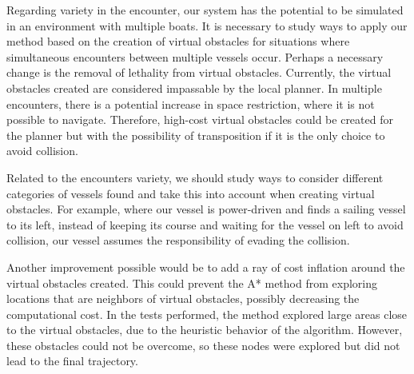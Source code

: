     Regarding variety in the encounter, our system has the potential to be simulated in an environment with multiple boats. It is necessary to study ways to apply our method based on the creation of virtual obstacles for situations where simultaneous encounters between multiple vessels occur. Perhaps a necessary change is the removal of lethality from virtual obstacles. Currently, the virtual obstacles created are considered impassable by the local planner. In multiple encounters, there is a potential increase in space restriction, where it is not possible to navigate. Therefore, high-cost virtual obstacles could be created for the planner but with the possibility of transposition if it is the only choice to avoid collision.
    
    Related to the encounters variety, we should study ways to consider different categories of vessels found and take this into account when creating virtual obstacles. For example, where our vessel is power-driven and finds a sailing vessel to its left, instead of keeping its course and waiting for the vessel on left to avoid collision, our vessel assumes the responsibility of evading the collision.
    
    Another improvement possible would be to add a ray of cost inflation around the virtual obstacles created. This could prevent the A* method from exploring locations that are neighbors of virtual obstacles, possibly decreasing the computational cost. In the tests performed, the method explored large areas close to the virtual obstacles, due to the heuristic behavior of the algorithm. However, these obstacles could not be overcome, so these nodes were explored but did not lead to the final trajectory.